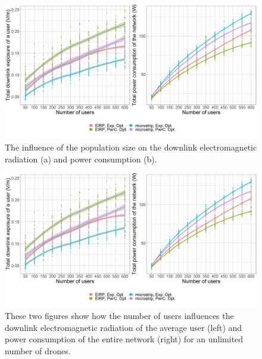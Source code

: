 \documentclass[twocolumn]{phdsymp} %
\begin{document}
\begin{figure}[h!]
  \includegraphics[width=\linewidth]{../results/s3/uvsdlAndPc.png}
  \caption{The influence of the population size on the downlink electromagnetic radiation (a) and power consumption (b).}
  \label{fig:s3b_dlAndPC}
\end{figure}

\begin{figure}[h!]
  \includegraphics[width=\linewidth]{../results/s3/uvsdlAndPc.png}
  \caption{These two figures show how the number of users influences the downlink electromagnetic radiation of the average user (left) and 
  power consumption of the entire network (right) for an unlimited number of drones.}
  \label{fig:s3b_dlAndPC}
\end{figure}
\end{document}
